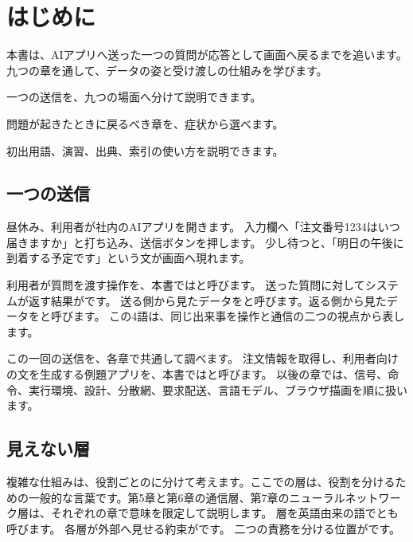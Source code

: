 \chapter{はじめに}

\begin{chapterabstract}
本書は、AIアプリへ送った一つの質問が応答として画面へ戻るまでを追います。
九つの章を通して、データの姿と受け渡しの仕組みを学びます。
\end{chapterabstract}

\begin{learninggoals}
  \item 一つの送信を、九つの場面へ分けて説明できます。
  \item 問題が起きたときに戻るべき章を、症状から選べます。
  \item 初出用語、演習、出典、索引の使い方を説明できます。
\end{learninggoals}


\section{一つの送信}

昼休み、利用者が社内のAIアプリを開きます。
入力欄へ「注文番号1234はいつ届きますか」と打ち込み、送信ボタンを押します。
少し待つと、「明日の午後に到着する予定です」という文が画面へ現れます。

利用者が質問を渡す操作を、本書ではと呼びます。
送った質問に対してシステムが返す結果がです。
送る側から見たデータをと呼びます。返る側から見たデータをと呼びます。
この4語は、同じ出来事を操作と通信の二つの視点から表します。

この一回の送信を、各章で共通して調べます。
注文情報を取得し、利用者向けの文を生成する例題アプリを、本書ではと呼びます。
以後の章では、信号、命令、実行環境、設計、分散網、要求配送、言語モデル、ブラウザ描画を順に扱います。
\section{見えない層}

複雑な仕組みは、役割ごとのに分けて考えます。ここでの層は、役割を分けるための一般的な言葉です。第5章と第6章の通信層、第7章のニューラルネットワーク層は、それぞれの章で意味を限定して説明します。
層を英語由来の語でとも呼びます。
各層が外部へ見せる約束がです。
二つの責務を分ける位置がです。

